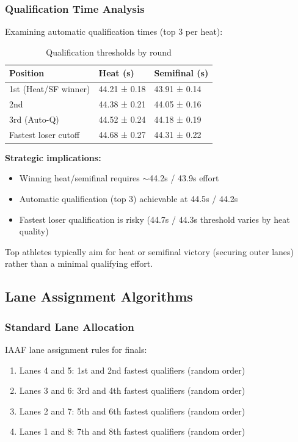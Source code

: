 \subsubsection{Qualification Time Analysis}

Examining automatic qualification times (top 3 per heat):

\begin{table}[H]
\centering
\caption{Qualification thresholds by round}
\begin{tabular}{@{}lll@{}}
\toprule
\textbf{Position} & \textbf{Heat (s)} & \textbf{Semifinal (s)} \\
\midrule
1st (Heat/SF winner) & 44.21 ± 0.18 & 43.91 ± 0.14 \\
2nd & 44.38 ± 0.21 & 44.05 ± 0.16 \\
3rd (Auto-Q) & 44.52 ± 0.24 & 44.18 ± 0.19 \\
\midrule
Fastest loser cutoff & 44.68 ± 0.27 & 44.31 ± 0.22 \\
\bottomrule
\end{tabular}
\end{table}

\textbf{Strategic implications:}
\begin{itemize}
    \item Winning heat/semifinal requires $\sim$44.2s / 43.9s effort
    \item Automatic qualification (top 3) achievable at 44.5s / 44.2s
    \item Fastest loser qualification is risky (44.7s / 44.3s threshold varies by heat quality)
\end{itemize}

Top athletes typically aim for heat or semifinal victory (securing outer lanes) rather than a minimal qualifying effort.

\subsection{Lane Assignment Algorithms}

\subsubsection{Standard Lane Allocation}

IAAF lane assignment rules for finals:
\begin{enumerate}
    \item Lanes 4 and 5: 1st and 2nd fastest qualifiers (random order)
    \item Lanes 3 and 6: 3rd and 4th fastest qualifiers (random order)
    \item Lanes 2 and 7: 5th and 6th fastest qualifiers (random order)
    \item Lanes 1 and 8: 7th and 8th fastest qualifiers (random order)
\end{enumerate}

